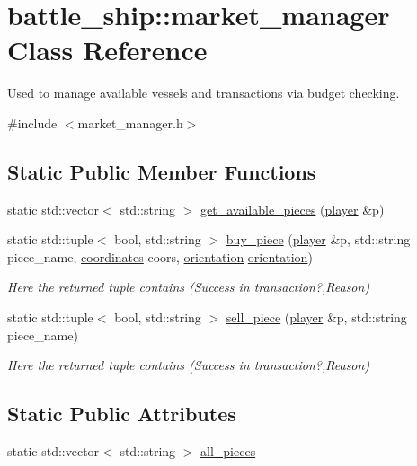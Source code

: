 \hypertarget{classbattle__ship_1_1market__manager}{}\section{battle\+\_\+ship\+:\+:market\+\_\+manager Class Reference}
\label{classbattle__ship_1_1market__manager}


Used to manage available vessels and transactions via budget checking.  




{\ttfamily \#include $<$market\+\_\+manager.\+h$>$}

\subsection*{Static Public Member Functions}
\begin{DoxyCompactItemize}
\item 
static std\+::vector$<$ std\+::string $>$ \hyperlink{classbattle__ship_1_1market__manager_a7f0c8f8ddbf6f2e49b9004ea1f05bfe7}{get\+\_\+available\+\_\+pieces} (\hyperlink{classbattle__ship_1_1player}{player} \&p)
\item 
static std\+::tuple$<$ bool, std\+::string $>$ \hyperlink{classbattle__ship_1_1market__manager_afc7b9ed406cf2f728e658cec16232408}{buy\+\_\+piece} (\hyperlink{classbattle__ship_1_1player}{player} \&p, std\+::string piece\+\_\+name, \hyperlink{structbattle__ship_1_1coordinates}{coordinates} coors, \hyperlink{namespacebattle__ship_aed87488f0a73f0d0679fe343fb61c784}{orientation} \hyperlink{namespacebattle__ship_aed87488f0a73f0d0679fe343fb61c784}{orientation})
\begin{DoxyCompactList}\small\item\em Here the returned tuple contains (Success in transaction?,Reason) \end{DoxyCompactList}\item 
static std\+::tuple$<$ bool, std\+::string $>$ \hyperlink{classbattle__ship_1_1market__manager_abfdff8ba2f4098656d9c53140c34876c}{sell\+\_\+piece} (\hyperlink{classbattle__ship_1_1player}{player} \&p, std\+::string piece\+\_\+name)
\begin{DoxyCompactList}\small\item\em Here the returned tuple contains (Success in transaction?,Reason) \end{DoxyCompactList}\end{DoxyCompactItemize}
\subsection*{Static Public Attributes}
\begin{DoxyCompactItemize}
\item 
static std\+::vector$<$ std\+::string $>$ \hyperlink{classbattle__ship_1_1market__manager_aa3d94799ba18b9a14edc9b2edc0ffd8d}{all\+\_\+pieces}
\end{DoxyCompactItemize}


